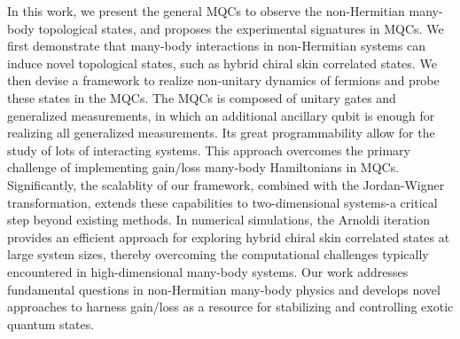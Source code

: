 \documentclass[longbibliography, aps, prx, amsmath, amssymb, amsfonts, twocolumn,superscriptaddress, footinbib]{revtex4-1}
\begin{document}
	In this work, we present the general MQCs to observe the non-Hermitian many-body topological states,
	and proposes the experimental signatures in MQCs.
	We first demonstrate that many-body interactions in non-Hermitian systems can induce novel topological states, such as hybrid chiral skin correlated states.
	We then devise a framework to realize non-unitary dynamics of fermions  and probe these states in the MQCs. The MQCs is composed of unitary gates and generalized measurements, in which an additional ancillary qubit is enough for realizing all generalized measurements. Its great programmability allow for the study of lots of interacting systems. 
	This approach overcomes the primary challenge of implementing gain/loss many-body Hamiltonians in MQCs.
	Significantly, the scalablity of our framework, combined with the Jordan-Wigner transformation, extends these capabilities to two-dimensional systems-a critical step beyond existing methods.
	In numerical simulations, the Arnoldi iteration provides an efficient approach for exploring hybrid chiral skin correlated states at large system sizes, thereby overcoming the computational challenges typically encountered in high-dimensional many-body systems. 
	Our work addresses fundamental questions in non-Hermitian many-body physics and develops novel approaches to harness gain/loss as a resource for stabilizing and controlling exotic quantum states. 
\end{document}
